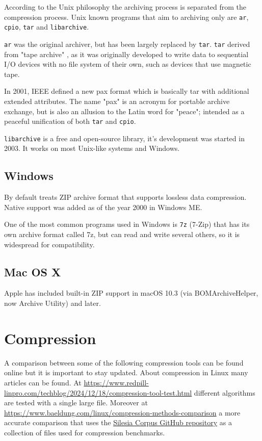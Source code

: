 \documentclass[12pt, a4paper]{report}
\begin{document}
According to the Unix philosophy the archiving process is separated from the compression process.
Unix known programs that aim to archiving only are \texttt{ar}, \texttt{cpio}, \texttt{tar} and \texttt{libarchive}.

\texttt{ar} was the original archiver, but has been largely replaced by \texttt{tar}.
\texttt{tar} derived from "tape archive" , as it was originally developed to write data to sequential I/O devices with no file
system of their own, such as devices that use magnetic tape.

In 2001, IEEE defined a new pax format which is basically tar with additional extended attributes.
The name "pax" is an acronym for portable archive exchange, but is also an allusion to the Latin word for "peace"; intended as a
peaceful unification of both \texttt{tar} and \texttt{cpio}.

\texttt{libarchive} is a free and open-source library, it's development was started in 2003.
It works on most Unix-like systems and Windows.

\subsection{Windows}

By default treats ZIP archive format that supports lossless data compression.
Native support was added as of the year 2000 in Windows ME.

One of the most common programs used in Windows is \texttt{7z} (7-Zip) that has its own archive format called 7z, but can read and
write several others, so it is widespread for compatibility.

\subsection{Mac OS X}

Apple has included built-in ZIP support in macOS 10.3 (via BOMArchiveHelper, now Archive Utility) and later.

\section{Compression}

A comparison between some of the following compression tools can be found online but it is important to stay updated.
About compression in Linux many articles can be found.
At \url{https://www.redpill-linpro.com/techblog/2024/12/18/compression-tool-test.html} different algorithms are tested with a
single large file.
Moreover at \url{https://www.baeldung.com/linux/compression-methods-comparison} a more accurate comparison that uses the
\href{https://github.com/MiloszKrajewski/SilesiaCorpus}{Silesia Corpus GitHub repository} as a collection of files used for
compression benchmarks.
\end{document}
